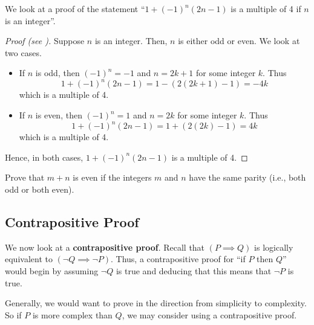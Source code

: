 \begin{example}
    We look at a proof of the statement ``$1 + (-1)^n(2n-1)$ is a multiple of 4 if $n$ is an integer''.
    \begin{proof}[Proof (see {\cite[p.~124]{hammack_2018}})]
        Suppose $n$ is an integer. Then, $n$ is either odd or even. We look at two cases.
        \begin{itemize}
            \item If $n$ is odd, then $(-1)^n = -1$ and $n = 2k+1$ for some integer $k$. Thus
            \[
                1 + (-1)^n(2n-1) = 1 - (2(2k+1)-1) = -4k
            \]
            which is a multiple of 4.
            \item If $n$ is even, then $(-1)^n = 1$ and $n = 2k$ for some integer $k$. Thus
            \[
                1 + (-1)^n(2n-1) = 1 + (2(2k)-1) = 4k
            \]
            which is a multiple of 4.
        \end{itemize}
        Hence, in both cases, $1 + (-1)^n(2n-1)$ is a multiple of 4.
    \end{proof}
\end{example}

\begin{exercise}
    Prove that $m + n$ is even if the integers $m$ and $n$ have the same parity (i.e., both odd or both even). 
\end{exercise}

\subsection{Contrapositive Proof}
We now look at a \textbf{contrapositive proof}. Recall that $(P \implies Q)$ is logically equivalent to $(\lnot Q \implies \lnot P)$. Thus, a contrapositive proof for ``if $P$ then $Q$'' would begin by assuming $\lnot Q$ is true and deducing that this means that $\lnot P$ is true.

Generally, we would want to prove in the direction from simplicity to complexity. So if $P$ is more complex than $Q$, we may consider using a contrapositive proof.

